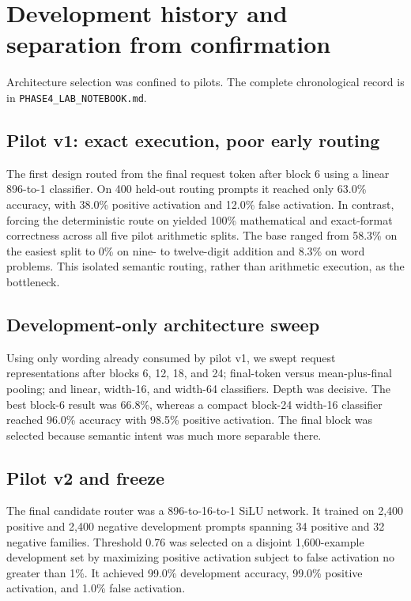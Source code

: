 \documentclass[11pt]{article}
\newcommand{\code}[1]{\texttt{#1}}
\begin{document}
\section{Development history and separation from confirmation}

Architecture selection was confined to pilots. The complete chronological
record is in \code{PHASE4\_LAB\_NOTEBOOK.md}.

\subsection{Pilot v1: exact execution, poor early routing}

The first design routed from the final request token after block 6 using a
linear 896-to-1 classifier. On 400 held-out routing prompts it reached only
63.0\% accuracy, with 38.0\% positive activation and 12.0\% false activation.
In contrast, forcing the deterministic route on yielded 100\% mathematical
and exact-format correctness across all five pilot arithmetic splits. The
base ranged from 58.3\% on the easiest split to 0\% on nine- to twelve-digit
addition and 8.3\% on word problems. This isolated semantic routing, rather
than arithmetic execution, as the bottleneck.

\subsection{Development-only architecture sweep}

Using only wording already consumed by pilot v1, we swept request
representations after blocks 6, 12, 18, and 24; final-token versus
mean-plus-final pooling; and linear, width-16, and width-64 classifiers. Depth
was decisive. The best block-6 result was 66.8\%, whereas a compact
block-24 width-16 classifier reached 96.0\% accuracy with 98.5\% positive
activation. The final block was selected because semantic intent was much
more separable there.

\subsection{Pilot v2 and freeze}

The final candidate router was a 896-to-16-to-1 SiLU network. It trained on
2,400 positive and 2,400 negative development prompts spanning 34 positive
and 32 negative families. Threshold 0.76 was selected on a disjoint
1,600-example development set by maximizing positive activation subject to
false activation no greater than 1\%. It achieved 99.0\% development
accuracy, 99.0\% positive activation, and 1.0\% false activation.
\end{document}
